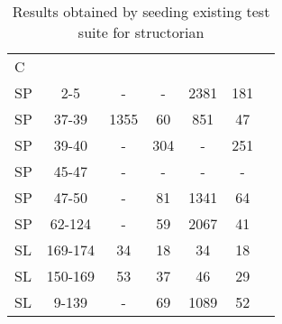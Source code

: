 \begin{table}
\begin{CodeOut}
\begin{center}
\caption {\label{table:rq5}\scriptsize{Results obtained by seeding existing test suite for structorian}}
\begin {tabular} {|l|c|c|c|c|c|c|}
\hline
&&&&&\\ 
\hline
C & \CenterCell{V} &\CenterCell{$N_{Pex}$}&\CenterCell{$Np_{seed}$} &\CenterCell{$N_{eXpress}$} &\CenterCell{$Ne_{seed}$}\\

\hline
SP&2-5&-&-&2381&181\\
\hline
SP&37-39&1355&60&851&47\\
\hline
SP&39-40&-&304&-&251\\
\hline
SP&45-47&-&-&-&-\\
\hline
SP&47-50&-&81&1341&64\\
\hline
SP&62-124&-&59&2067&41\\
\hline
SL&169-174&34&18&34&18\\
\hline
SL&150-169&53&37&46&29\\
\hline
SL&9-139&-&69&1089&52\\
\hline
\end{tabular}
\end{center}
\end{CodeOut}
\vspace{- 0.4 in}
\end{table}


